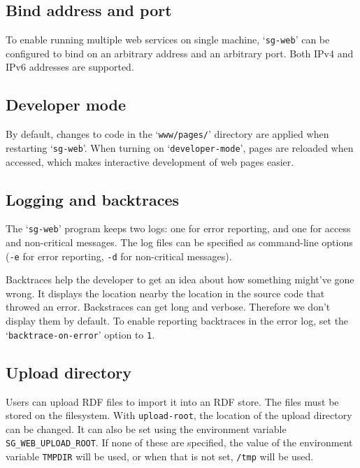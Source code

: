 \subsection{Bind address and port}

  To enable running multiple web services on single machine, `\texttt{sg-web}'
  can be configured to bind on an arbitrary address and an arbitrary port.
  Both IPv4 and IPv6 addresses are supported.

\subsection{Developer mode}

  By default, changes to code in the `\texttt{www/pages/}' directory are
  applied when restarting `\texttt{sg-web}'.  When turning on
  `\texttt{developer-mode}', pages are reloaded when accessed, which makes
  interactive development of web pages easier.

\subsection{Logging and backtraces}
\label{sec:logging}

  The `\texttt{sg-web}' program keeps two logs: one for error reporting, and
  one for access and non-critical messages.  The log files can be specified
  as command-line options (\texttt{-e} for error reporting, \texttt{-d} for
  non-critical messages).

  Backtraces help the developer to get an idea about how something might've
  gone wrong.  It displays the location nearby the location in the source code
  that throwed an error.  Backstraces can get long and verbose.  Therefore we
  don't display them by default.  To enable reporting backtraces in the error
  log, set the `\texttt{backtrace-on-error}' option to \texttt{1}.

\subsection{Upload directory}

  Users can upload RDF files to import it into an RDF store.  The files must
  be stored on the filesystem.  With \texttt{upload-root}, the location of
  the upload directory can be changed.  It can also be set using the
  environment variable \texttt{SG\_WEB\_UPLOAD\_ROOT}.  If none of these are
  specified, the value of the environment variable \texttt{TMPDIR} will be
  used, or when that is not set, \texttt{/tmp} will be used.

